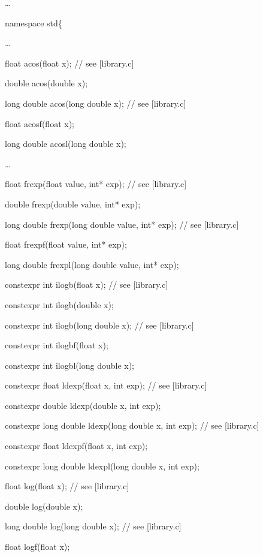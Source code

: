 \documentclass[prd,twocolumn,amsmath,amssymb,nofootinbib,eqsecnum]{revtex4-1}
\newcommand{\highlight}[1]{{\color{red} #1}}
\begin{document}
\begin{widetext}
{\ldots

namespace std\{

\ldots

float acos(float x); // see [library.c]

double acos(double x);

long double acos(long double x); // see [library.c]

float acosf(float x);

long double acosl(long double x);

\ldots

float frexp(float value, int* exp); // see [library.c]

double frexp(double value, int* exp);

long double frexp(long double value, int* exp); // see [library.c]

float frexpf(float value, int* exp);

long double frexpl(long double value, int* exp);

\vspace{2ex}

\highlight{constexpr} int ilogb(float x); // see [library.c]

\highlight{constexpr} int ilogb(double x);

\highlight{constexpr} int ilogb(long double x); // see [library.c]

\highlight{constexpr} int ilogbf(float x);

\highlight{constexpr} int ilogbl(long double x);

\vspace{2ex}

\highlight{constexpr} float ldexp(float x, int exp); // see [library.c]

\highlight{constexpr} double ldexp(double x, int exp);

\highlight{constexpr} long double ldexp(long double x, int exp); // see [library.c]

\highlight{constexpr} float ldexpf(float x, int exp);

\highlight{constexpr} long double ldexpl(long double x, int exp);

\vspace{2ex}

float log(float x); // see [library.c]

double log(double x);

long double log(long double x); // see [library.c]

float logf(float x);

}
\end{widetext}
\end{document}
